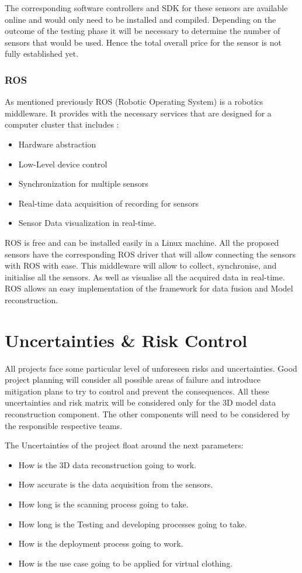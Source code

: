 \documentclass[12pt]{report}
\begin{document}
The corresponding software controllers and SDK for these sensors are available online and would only need to be installed and compiled. 
Depending on the outcome of the testing phase it will be necessary to determine the number of sensors that would be used. Hence the total overall price for the sensor is not fully established yet. 

\subsubsection{ROS}
As mentioned previously ROS (Robotic Operating System) is a robotics middleware. It provides with the necessary services that are designed for a computer cluster that includes : 
\begin{itemize}
  \item Hardware abstraction
  \item Low-Level device control
  \item Synchronization for multiple sensors
  \item Real-time data acquisition of recording for sensors
  \item Sensor Data visualization in real-time.
\end{itemize}

ROS is free and can be installed easily in a Linux machine. All the proposed sensors have the corresponding ROS driver that will allow connecting the sensors with ROS with ease. 
This middleware will allow to collect, synchronise, and initialise all the sensors. As well as visualise all the acquired data in real-time. ROS allows an easy implementation of the framework for data fusion and Model reconstruction. 

\section{Uncertainties \& Risk Control}
All projects face some particular level of unforeseen risks and uncertainties. Good project planning will consider all possible areas of failure and introduce mitigation plans to try to control and prevent the consequences.  
All these uncertainties and risk matrix will be considered only for the 3D model data reconstruction component. The other components will need to be considered by the responsible respective teams. 

\newpage
The Uncertainties of the project float around the next parameters:
\begin{itemize}
  \item How is the 3D data reconstruction going to work.
  \item How accurate is the data acquisition from the sensors.
  \item How long is the scanning process going to take. 
  \item How long is the Testing and developing processes going to take. 
  \item How is the deployment process going to work.
  \item How is the use case going to be applied for virtual clothing.
\end{itemize}
\end{document}
